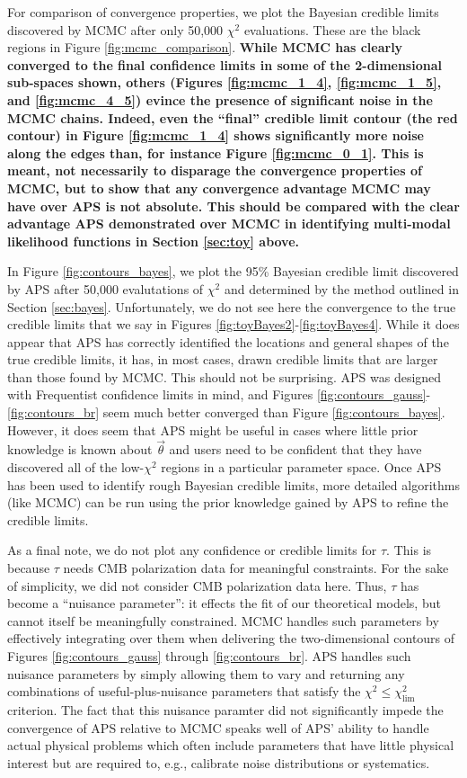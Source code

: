 \documentclass[useAMS,usenatbib]{aastex}
\begin{document}
For comparison of convergence properties, we plot the Bayesian credible limits discovered
by MCMC after only 50,000 $\chi^2$ evaluations.  These are the black regions in
Figure \ref{fig:mcmc_comparison}.  
{\bf %
While MCMC has clearly converged to the final
confidence limits in some of the 2-dimensional sub-spaces shown,
others (Figures \ref{fig:mcmc_1_4}, \ref{fig:mcmc_1_5}, and \ref{fig:mcmc_4_5})
evince the presence of significant noise in the MCMC chains.
Indeed, even the ``final'' credible limit contour (the red contour) in Figure
\ref{fig:mcmc_1_4} shows significantly more noise along the edges than, for instance
Figure \ref{fig:mcmc_0_1}.  This is meant, not necessarily to disparage the convergence
properties of MCMC, but to show that any convergence advantage MCMC may have over APS is
not absolute.  This should be compared with the clear advantage APS demonstrated over 
MCMC in identifying multi-modal likelihood functions in Section \ref{sec:toy} above.
} %

In Figure \ref{fig:contours_bayes}, we plot the 95\% Bayesian credible limit discovered
by APS after 50,000 evalutations of $\chi^2$ and determined by the method outlined in
Section \ref{sec:bayes}.  Unfortunately, we do not see here the convergence to the true
credible limits that we say in Figures \ref{fig:toyBayes2}-\ref{fig:toyBayes4}.  While
it does appear that APS has correctly identified the locations and general shapes of the
true credible limits, it has, in most cases, drawn credible limits that are larger than
those found by MCMC.  This should not be surprising.  APS was designed with Frequentist
confidence limits in mind, and Figures \ref{fig:contours_gauss}-\ref{fig:contours_br}
seem much better converged than Figure \ref{fig:contours_bayes}.  However, it does seem
that APS might be useful in cases where little prior knowledge is known about $\vec{\theta}$
and users need to be confident that they have discovered all of the low-$\chi^2$
regions in a particular parameter space.  Once APS has been used to identify rough
Bayesian credible limits, more detailed algorithms (like MCMC) can be run using the prior
knowledge gained by APS to refine the credible limits.

As a final note, we do not plot any confidence or 
credible limits for $\tau$.
This is because $\tau$ needs CMB polarization data for meaningful constraints.  For the sake
of simplicity, we did not consider CMB polarization data here.  Thus, $\tau$ has become a
``nuisance parameter'': it effects the fit of our theoretical models, but cannot itself be
meaningfully constrained.  MCMC handles such parameters by effectively integrating over them
when delivering the two-dimensional contours of Figures
\ref{fig:contours_gauss} through \ref{fig:contours_br}.  
APS handles such nuisance parameters by
simply allowing them to vary and returning any combinations of useful-plus-nuisance parameters
that satisfy the $\chi^2\le\chi^2_\text{lim}$ criterion.  The fact that this nuisance
paramter did not significantly impede the convergence of APS relative to MCMC speaks 
well of
APS' ability to handle actual physical problems which 
often include parameters that have
little physical interest but are required to, e.g., 
calibrate noise distributions or
systematics.
\end{document}
